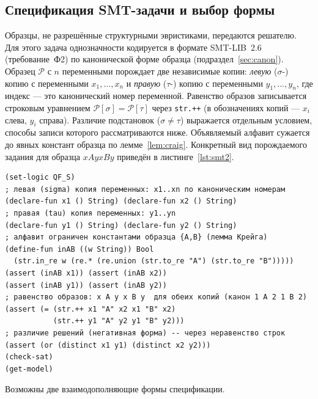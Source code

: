 \documentclass[14pt, russian]{scrartcl}
\begin{document}
\subsection{Спецификация SMT-задачи и выбор формы}
\label{sec:smtspec}

Образцы, не разрешённые структурными эвристиками, передаются решателю. Для этого задача
однозначности кодируется в формате SMT-LIB~2.6 (требование~Ф2) по канонической форме
образца (подраздел~\ref{sec:canon}). Образец $\mathcal{P}$ с $n$ переменными порождает
две независимые копии: \textit{левую} ($\sigma$-) копию с переменными $x_1, \dots, x_n$ и
\textit{правую} ($\tau$-) копию с переменными $y_1, \dots, y_n$, где индекс --- это
канонический номер переменной. Равенство образов записывается строковым уравнением
$\mathcal{P}[\sigma] = \mathcal{P}[\tau]$ через \texttt{str.++} (в обозначениях копий ---
$x_i$ слева, $y_i$ справа). Различие подстановок
($\sigma \neq \tau$) выражается отдельным условием, способы записи которого
рассматриваются ниже. Объявляемый алфавит сужается до явных констант образца по
лемме~\ref{lem:craig}. Конкретный вид порождаемого задания для образца $x A y x B y$
приведён в листинге~\ref{lst:smt2}.

\begin{listing}[h!]
\caption{SMT-LIB-кодировка задачи однозначности образца $x A y x B y$
(канон $1\,A\,2\,1\,B\,2$, негативная форма)}
\label{lst:smt2}
\begin{Verbatim}[breaklines=true, fontsize=\small]
(set-logic QF_S)
; левая (sigma) копия переменных: x1..xn по каноническим номерам
(declare-fun x1 () String) (declare-fun x2 () String)
; правая (tau) копия переменных: y1..yn
(declare-fun y1 () String) (declare-fun y2 () String)
; алфавит ограничен константами образца {A,B} (лемма Крейга)
(define-fun inAB ((w String)) Bool
  (str.in_re w (re.* (re.union (str.to_re "A") (str.to_re "B")))))
(assert (inAB x1)) (assert (inAB x2))
(assert (inAB y1)) (assert (inAB y2))
; равенство образов: x A y x B y  для обеих копий (канон 1 A 2 1 B 2)
(assert (= (str.++ x1 "A" x2 x1 "B" x2)
           (str.++ y1 "A" y2 y1 "B" y2)))
; различие решений (негативная форма) -- через неравенство строк
(assert (or (distinct x1 y1) (distinct x2 y2)))
(check-sat)
(get-model)
\end{Verbatim}
\end{listing}

Возможны две взаимодополняющие формы спецификации.
\end{document}
